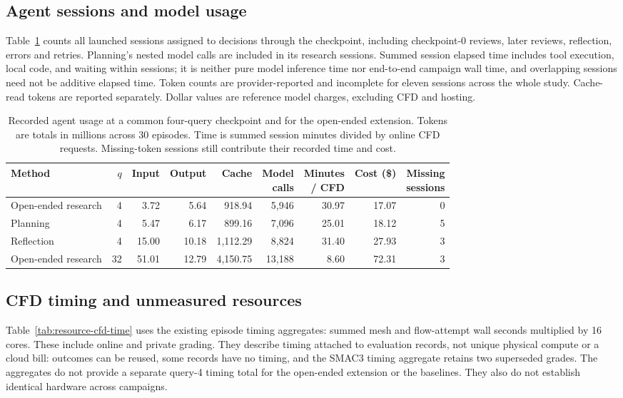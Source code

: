 \subsection{Agent sessions and model usage}
Table~\ref{tab:resource-model} counts all launched sessions assigned to decisions through the checkpoint, including checkpoint-0 reviews, later reviews, reflection, errors and retries. Planning's nested model calls are included in its research sessions. Summed session elapsed time includes tool execution, local code, and waiting within sessions; it is neither pure model inference time nor end-to-end campaign wall time, and overlapping sessions need not be additive elapsed time. Token counts are provider-reported and incomplete for eleven sessions across the whole study. Cache-read tokens are reported separately. Dollar values are reference model charges, excluding CFD and hosting.

\begin{table}[htbp]\centering\scriptsize
\caption{Recorded agent usage at a common four-query checkpoint and for the open-ended extension. Tokens are totals in millions across 30 episodes. Time is summed session minutes divided by online CFD requests. Missing-token sessions still contribute their recorded time and cost.}
\label{tab:resource-model}
\setlength{\tabcolsep}{2pt}
\begin{tabular*}{\textwidth}{@{\extracolsep{\fill}}lrrrrrrrr}\toprule
Method & $q$ & Input & Output & Cache & \shortstack{Model\\calls} & \shortstack{Minutes\\/ CFD} & \shortstack{Cost\\(\$)} & \shortstack{Missing\\sessions} \\ \midrule
Open-ended research & 4 & 3.72 & 5.64 & 918.94 & 5{,}946 & 30.97 & 17.07 & 0 \\
Planning & 4 & 5.47 & 6.17 & 899.16 & 7{,}096 & 25.01 & 18.12 & 5 \\
Reflection & 4 & 15.00 & 10.18 & 1{,}112.29 & 8{,}824 & 31.40 & 27.93 & 3 \\
Open-ended research & 32 & 51.01 & 12.79 & 4{,}150.75 & 13{,}188 & 8.60 & 72.31 & 3 \\
\bottomrule\end{tabular*}\end{table}

\subsection{CFD timing and unmeasured resources}
Table~\ref{tab:resource-cfd-time} uses the existing episode timing aggregates: summed mesh and flow-attempt wall seconds multiplied by 16 cores. These include online and private grading. They describe timing attached to evaluation records, not unique physical compute or a cloud bill: outcomes can be reused, some records have no timing, and the SMAC3 timing aggregate retains two superseded grades. The aggregates do not provide a separate query-4 timing total for the open-ended extension or the baselines. They also do not establish identical hardware across campaigns.

